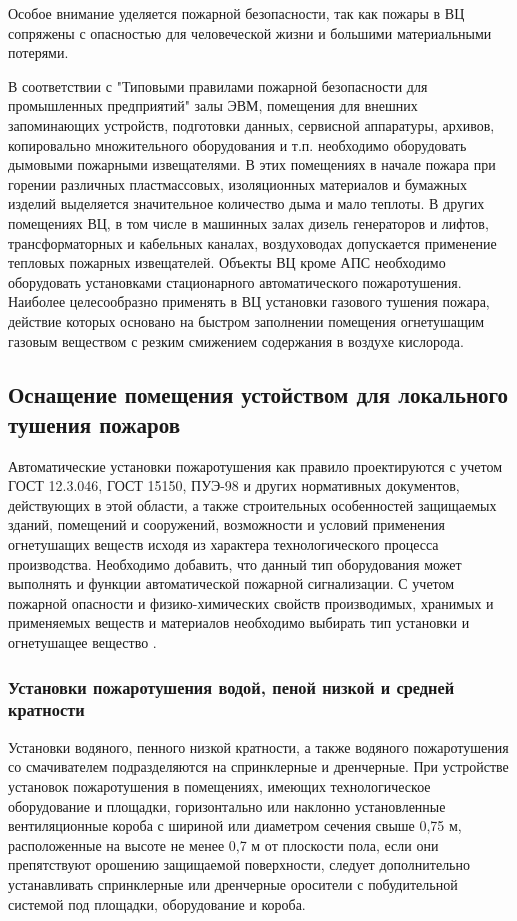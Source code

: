 Особое внимание уделяется пожарной безопасности, так как пожары в ВЦ сопряжены с опасностью для человеческой
жизни и большими материальными потерями.

В соответствии с "Типовыми правилами пожарной безопасности для промышленных предприятий" залы ЭВМ, помещения
для внешних запоминающих устройств, подготовки данных, сервисной аппаратуры, архивов, копировально множительного
оборудования и т.п. необходимо оборудовать дымовыми пожарными извещателями. В этих помещениях в начале пожара
при горении различных пластмассовых, изоляционных материалов и бумажных изделий выделяется значительное количество
дыма и мало теплоты. В других помещениях ВЦ, в том числе в машинных залах дизель генераторов и лифтов, трансформаторных
и кабельных каналах, воздуховодах допускается применение тепловых пожарных извещателей. Объекты ВЦ кроме АПС необходимо
оборудовать установками стационарного автоматического пожаротушения. Наиболее целесообразно применять в ВЦ установки
газового тушения пожара, действие которых основано на быстром заполнении помещения огнетушащим газовым веществом с
резким смижением содержания в воздухе кислорода.

\subsection{Оснащение помещения устойством для локального тушения пожаров}
Автоматические установки пожаротушения как правило проектируются с учетом ГОСТ 12.3.046, ГОСТ 15150, ПУЭ-98 и других нормативных
документов, действующих в этой области, а также строительных особенностей защищаемых зданий, помещений и сооружений, возможности
и условий применения огнетушащих веществ исходя из характера технологического процесса производства.
Необходимо добавить, что данный тип оборудования может выполнять и функции автоматической пожарной сигнализации.
С учетом пожарной опасности и физико-химических свойств производимых, хранимых и применяемых веществ и материалов необходимо
выбирать тип установки и огнетушащее вещество \cite{sec42}.

\subsubsection{Установки пожаротушения водой, пеной низкой и средней кратности}
Установки водяного, пенного низкой кратности, а также водяного пожаротушения со смачивателем подразделяются на спринклерные и дренчерные.
При устройстве установок пожаротушения в помещениях, имеющих технологическое оборудование и площадки, горизонтально или наклонно
установленные вентиляционные короба с шириной или диаметром сечения свыше 0,75 м, расположенные на высоте не менее 0,7 м от плоскости
пола, если они препятствуют орошению защищаемой поверхности, следует дополнительно устанавливать спринклерные или дренчерные
оросители с побудительной системой под площадки, оборудование и короба.

